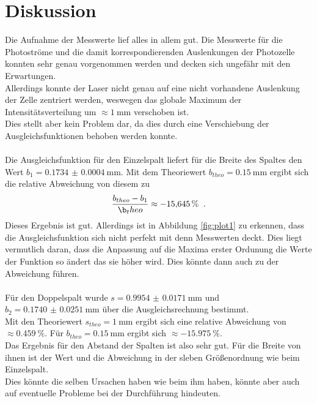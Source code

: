 \section{Diskussion}

\noindent Die Aufnahme der Messwerte lief alles in allem gut. Die Messwerte für die Photoströme und die damit korrespondierenden Auslenkungen der Photozelle konnten sehr genau vorgenommen werden und decken sich ungefähr mit den Erwartungen.\\
Allerdings konnte der Laser nicht genau auf eine nicht vorhandene Auslenkung der Zelle zentriert werden, weswegen das globale Maximum der Intensitätsverteilung um $\approx \SI{1}{\milli\metre}$ verschoben ist.\\
Dies stellt aber kein Problem dar, da dies durch eine Verschiebung der Ausgleichsfunktionen behoben werden konnte.\\\\
Die Ausgleichsfunktion für den Einzelspalt liefert für die Breite des Spaltes den Wert $ b_1=\SI{0.1734(00004)}{\milli\metre}$.
Mit dem Theoriewert $ b_{theo}=\SI{0.15}{\milli\metre}$ ergibt sich die relative Abweichung von diesem zu 
\begin{equation*}
    \frac{b_{theo}-b_1}{\b_theo}\approx \SI{-15.645}{\percent} \; \;.
\end{equation*}
Dieses Ergebnis ist gut. Allerdings ist in Abbildung \ref{fig:plot1} zu erkennen, dass die Ausgleichsfunktion sich nicht perfekt mit denn Messwerten deckt. 
Dies liegt vermutlich daran, dass die Anpassung auf die Maxima erster Ordunung die Werte der Funktion so ändert das sie höher wird. Dies könnte dann auch zu der Abweichung führen.\\\\
Für den Doppelspalt wurde $s=\SI{0.9954(00171)}{\milli\metre}$ und $ b_2=\SI{0.1740(00251)}{\milli\metre}$ über die Ausgleichsrechnung bestimmt.\\
Mit den Theoriewert $s_{theo}=\SI{1}{\milli\metre}$ ergibt sich eine relative Abweichung von $\approx\SI{0.459}{\percent}$. 
Für $b_{theo}=\SI{0.15}{\milli\metre}$ ergibt sich $\approx\SI{-15.975}{\percent}$.\\
Das Ergebnis für den Abstand der Spalten ist also sehr gut. Für die Breite von ihnen ist der Wert und die Abweichung in der sleben Größenordnung wie beim Einzelspalt.\\
Dies könnte die selben Ursachen haben wie beim ihm haben, könnte aber auch auf eventuelle Probleme bei der Durchführung hindeuten.\\ 
